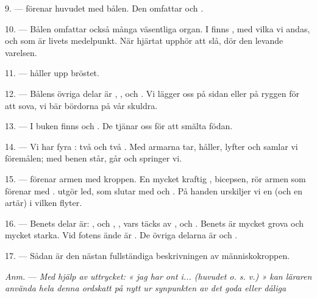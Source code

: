 \VUsaut{4.4mm}
\VUsaut{3.0mm}

9. ---  förenar huvudet med bålen. Den omfattar  och
.

10. --- Bålen omfattar också många väsentliga organ. I  finns
, med vilka vi andas, och  som är livets
medelpunkt. När hjärtat upphör att slå, dör den levande varelsen.

11. ---  håller upp bröstet.

12. --- Bålens övriga delar är , ,
 och . Vi lägger oss på sidan eller på ryggen
för att sova, vi bär bördorna på vår skuldra.

13. --- I buken finns  och . De tjänar oss för att smälta
födan.

\VUsaut{4.4mm}
\VUsaut{3.0mm}

14. --- Vi har fyra : två  och två . Med armarna
tar, håller, lyfter och samlar vi föremålen; med benen står, går och springer vi.

15. ---  förenar armen med kroppen. En mycket kraftig
, bicepsen, rör armen som  förenar med
.  utgör  led, som slutar
med  och . På handen urskiljer vi en
 (och en artär) i vilken  flyter.

16. --- Benets delar är: ,  och ,
, vars  täcks av , 
och . Benets  är mycket grova och mycket starka. Vid fotens ände är
. De övriga delarna är  och
.

17. --- Sådan är den nästan fullständiga beskrivningen av människokroppen.

\textit{Anm.} --- \textit{Med hjälp av uttrycket: « jag har ont i... (huvudet o. s. v.) » kan
läraren använda hela denna ordskatt på nytt ur synpunkten av det goda eller dåliga}

\VUsaut{5.0mm}
\VUsaut{2.4mm}
\VUsaut{3.0mm}

